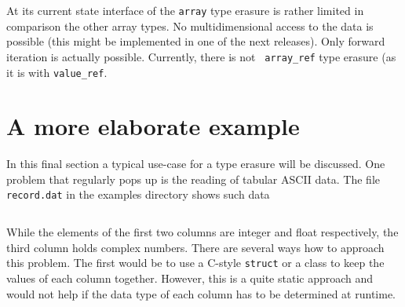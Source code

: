 At its current state interface of the {\tt array} type  erasure is rather
limited in comparison the other array types. No multidimensional access to the
data is possible (this might be implemented in one of the next releases). 
Only forward iteration is actually possible. Currently, there is not {\tt
array\_ref} type erasure (as it is with {\tt value\_ref}. 


\section{A more elaborate example}

\begin{figure}[tb]
\centering
{}
\end{figure}

In this final section a typical use-case for a type erasure will be discussed. 
One problem that regularly pops up is the reading of tabular ASCII data. 
The file {\tt record.dat} in the examples directory shows such data
\inputminted[fontsize=\small,
             frame=lines,
             label=examples/record.dat]
{text}{../examples/record.dat}
While the elements of the first two columns are integer and float respectively,
the third column holds complex numbers. There are several ways how to approach
this problem. The first would be to use a C-style {\tt struct} or a class to
keep the values of each column together. However, this is a quite static
approach and would not help if the data type of each column has to be determined
at runtime. 

